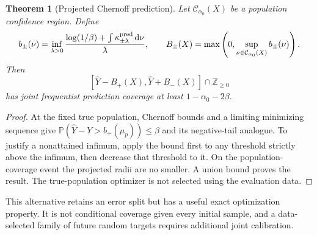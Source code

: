 \documentclass[11pt]{article}
\numberwithin{equation}{section}
\newtheorem{theorem}{Theorem}[section]
\theoremstyle{definition}
\theoremstyle{remark}
\newcommand{\Pp}{\mathbb P}
\newcommand{\Ccal}{\mathcal C}
\newcommand{\dd}{\,\mathrm d}
\begin{document}
\begin{theorem}[Projected Chernoff prediction]\label{thm:prediction}
Let $\Ccal_{\alpha_0}(X)$ be a population confidence region. Define
\[
 b_\pm(\nu)=\inf_{\lambda>0}
 \frac{\log(1/\beta)+\int\kappa^{\rm pred}_{\pm\lambda}\dd\nu}{\lambda},
 \qquad
 B_\pm(X)=\max\left(0,\sup_{\nu\in\Ccal_{\alpha_0}(X)}b_\pm(\nu)\right).
\]
Then
\begin{equation}\label{eq:predictioninterval}
 [\widehat Y-B_+(X),\widehat Y+B_-(X)]\cap\mathbb Z_{\ge0}
\end{equation}
has joint frequentist prediction coverage at least $1-\alpha_0-2\beta$.
\end{theorem}
\begin{proof}
At the fixed true population, Chernoff bounds and a limiting minimizing sequence give $\Pp(\widehat Y-Y>b_+(\mu_p))\le\beta$ and its negative-tail analogue. To justify a nonattained infimum, apply the bound first to any threshold strictly above the infimum, then decrease that threshold to it. On the population-coverage event the projected radii are no smaller. A union bound proves the result. The true-population optimizer is not selected using the evaluation data.
\end{proof}
This alternative retains an error split but has a useful exact optimization property. It is not conditional coverage given every initial sample, and a data-selected family of future random targets requires additional joint calibration.
\end{document}
